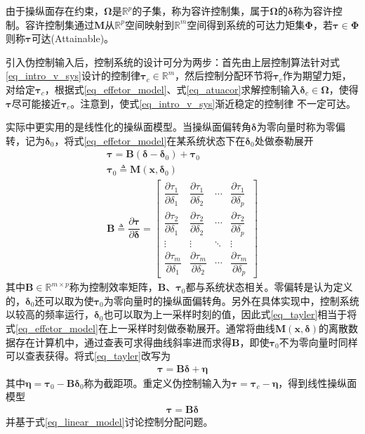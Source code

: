 由于操纵面存在约束，$\bm{\Omega}$是$\mathbb{R}^{p}$的子集，称为容许控制集，属于$\bm{\Omega}$的$\bm{\delta}$称为容许控制。容许控制集通过$\bm{M}$从$\mathbb{R}^{p}$空间映射到$\mathbb{R}^{m}$空间得到系统的可达力矩集$\bm{\Phi}$，若$\bm{\tau}\in \bm{\Phi} $则称$\bm{\tau}$可达(Attainable)。

引入伪控制输入后，控制系统的设计可分为两步：首先由上层控制算法针对式\eqref{eq_intro_v_sys}设计的控制律${\bm{\tau}_c} \in {{\mathbb{R}}^m}$，然后控制分配环节将$\bm{\tau}_c$作为期望力矩，对给定$\bm{\tau}_c$，根据式\eqref{eq_effetor_model}、式\eqref{eq_atuacor}求解控制输入${\bm{\delta}_c} \in {\bm{\Omega}}$，使得$ \bm{\tau} $尽可能接近${\bm{\tau}_c}$。注意到，使式\eqref{eq_intro_v_sys}渐近稳定的控制律 不一定可达。

实际中更实用的是线性化的操纵面模型。当操纵面偏转角$\bm{\delta}$为零向量时称为零偏转，记为$\bm{\delta}_0$，将式\eqref{eq_effetor_model}在某系统状态下在$\bm{\delta}_0$处做泰勒展开
\begin{gather}
\bm{\tau} =\bm{B}\left(\bm{\delta}-\bm{\delta}_{0}\right)+\bm{\tau}_{0} \label{eq_tayler} \\
\bm{\tau}_{0} \triangleq \bm{M}\left(\bm{x}, \bm{\delta}_{0}\right) \\
\bm{B} \triangleq \dfrac{\partial \bm{\tau}}{\partial \bm{\delta}}=\left[\begin{array}{cccc}
\dfrac{\partial \tau_{1}}{\partial \delta_{1}} & \dfrac{\partial \tau_{1}}{\partial \delta_{2}} & \cdots & \dfrac{\partial \tau_{1}}{\partial \delta_{p}} \\
\dfrac{\partial \tau_{2}}{\partial \delta_{1}} & \dfrac{\partial \tau_{2}}{\partial \delta_{2}} & \cdots & \dfrac{\partial \tau_{2}}{\partial \delta_{p}} \\
\vdots & \vdots & \ddots & \vdots \\
\dfrac{\partial \tau_{m}}{\partial \delta_{1}} & \dfrac{\partial \tau_{m}}{\partial \delta_{2}} & \cdots & \dfrac{\partial \tau_{m}}{\partial \delta_{p}}
\end{array}\right]
\end{gather}
其中$\bm{B}\in {{\mathbb{R}}^{m\times p}}$称为控制效率矩阵，$\bm{B}$、$\bm{\tau}_{0}$都与系统状态相关。零偏转是认为定义的\cite{Durham_2017}，$\bm{\delta}_0$还可以取为使$\bm{\tau}_{0}$为零向量时的操纵面偏转角。另外在具体实现中，控制系统以较高的频率运行，$\bm{\delta}_0$也可以取为上一采样时刻的值，因此式\eqref{eq_tayler}相当于将式\eqref{eq_effetor_model}在上一采样时刻做泰勒展开。通常将曲线$\bm{M}(\bm{x}, \bm{\delta}) $的离散数据存在计算机中，通过查表可求得曲线斜率进而求得$\bm{B}$，即使$\bm{\tau}_{0}$不为零向量时同样可以查表获得。将式\eqref{eq_tayler}改写为
\begin{align}
\bm{\tau}=\bm{B}\bm{\delta}+ \bm{\eta}
\end{align}
其中$ \bm{\eta}=\bm{\tau}_{0}-\bm{B}\bm{\delta}_{0} $称为截距项。重定义伪控制输入为$\bm{\tau} = \bm{\tau}_c-\bm{\eta}$，得到线性操纵面模型
\begin{align}
\bm{\tau}=\bm{B\delta} \label{eq_linear_model}
\end{align}
并基于式\eqref{eq_linear_model}讨论控制分配问题。

